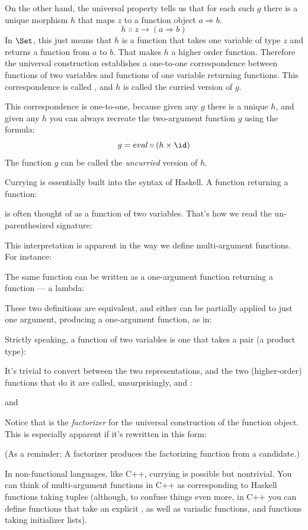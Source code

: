 On the other hand, the universal property tells us that for each such
$g$ there is a unique morphism $h$ that maps $z$ to
a function object $a \Rightarrow b$.
\[h \Colon z \to (a \Rightarrow b)\]
In $\Set$, this just means that $h$ is a function that
takes one variable of type $z$ and returns a function from
$a$ to $b$. That makes $h$ a higher order function.
Therefore the universal construction establishes a one-to-one
correspondence between functions of two variables and functions of one
variable returning functions. This correspondence is called
, and $h$ is called the curried version of $g$.

This correspondence is one-to-one, because given any $g$ there is
a unique $h$, and given any $h$ you can always recreate
the two-argument function $g$ using the formula:
\[g = eval \circ (h \times \id)\]
The function $g$ can be called the \emph{uncurried} version of $h$.

Currying is essentially built into the syntax of Haskell. A function
returning a function:

is often thought of as a function of two variables. That's how we read
the un-parenthesized signature:

This interpretation is apparent in the way we define multi-argument
functions. For instance:

The same function can be written as a one-argument function returning a
function --- a lambda:

These two definitions are equivalent, and either can be partially
applied to just one argument, producing a one-argument function, as in:

Strictly speaking, a function of two variables is one that takes a pair
(a product type):

It's trivial to convert between the two representations, and the two
(higher-order) functions that do it are called, unsurprisingly,
 and :

and

Notice that  is the \emph{factorizer} for the universal
construction of the function object. This is especially apparent if it's
rewritten in this form:

(As a reminder: A factorizer produces the factorizing function from a
candidate.)

In non-functional languages, like C++, currying is possible but
nontrivial. You can think of multi-argument functions in C++ as
corresponding to Haskell functions taking tuples (although, to confuse
things even more, in C++ you can define functions that take an explicit
, as well as variadic functions, and functions taking
initializer lists).

